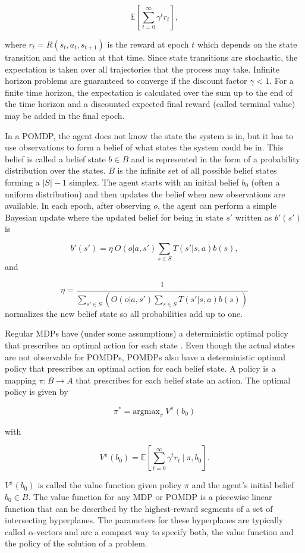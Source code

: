 \[\mathbb{E}\left[\sum_{t=0}^{\infty} \gamma^t r_t\right],\]

where \(r_t = R(s_t, a_t, s_{t+1})\) is the reward at epoch \(t\) which depends on the state transition and the action at that time.
Since state transitions are stochastic,
the expectation is taken over all trajectories that the process may take.
Infinite horizon problems are guaranteed to converge if the discount factor \(\gamma < 1\).
For a finite time horizon, the expectation is calculated over the sum up to the end of the
time horizon and a discounted expected final reward (called terminal value) may be added in the final epoch.

In a POMDP, the agent does not know the state the system is in, but it has to use
observations
to form a belief of what states the system could be in. This belief is called a belief state \(b \in B\) and is
represented in the form of a probability distribution over the states. \(B\) is the infinite set of all possible belief states
forming a \(|S|-1\) simplex.
The agent starts with an initial belief \(b_0\) (often a uniform distribution) and then updates the belief when new
observations are available.
In each epoch, after observing \(o\), the
agent can perform a simple Bayesian update where the
updated belief for being in state \(s'\) written as \(b'(s')\) is

\[
b'(s') = \eta\ O(o | a, s') \sum_{s \in S} T(s' | s,a) b(s),
\]
and

\[
\eta = \frac{1}{\sum_{s' \in S}\left( O(o | a, s') \sum_{s \in S} T(s' | s,a) b(s)\right)}
\]
normalizes the new belief state so all probabilities add up to one.

Regular MDPs have (under some assumptions) a deterministic optimal policy that prescribes an optimal action for
each state \citep{Puterman1994}. Even though
the actual states are not observable for POMDPs, POMDPs also have a
deterministic optimal policy that prescribes an optimal action for
each belief state.
A policy is a mapping \(\pi: B \rightarrow A\) that prescribes
for each belief state an action.
The optimal policy is given by

\[\pi^* = \mathrm{argmax}_\pi \  V^\pi(b_0)\]

with

\[V^\pi(b_0) =   \mathbb{E}\left[\sum_{t=0}^{\infty} \gamma^t r_t  \ \bigg\vert \ \pi, b_0 \right].\]

\(V^\pi(b_0)\)
is called the value function given policy \(\pi\) and the agent's
initial belief \(b_0 \in B\). The value function for any MDP or POMDP is a piecewise linear function that can be described by the
highest-reward segments of
a set of intersecting hyperplanes. The parameters for these hyperplanes are typically called \(\alpha\)-vectors and
are a compact way to specify
both, the value function and the policy of the solution of a problem.

